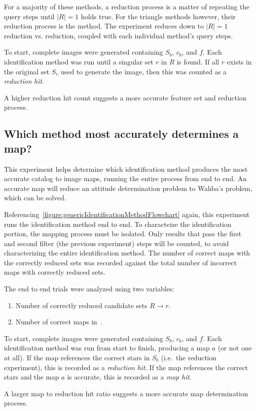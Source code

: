 For a majority of these methods, a reduction process is a matter of repeating the query steps until $|R|=1$ holds true.
For the triangle methods however, their reduction process is the  method.
The experiment reduces down to $|R|=1$ reduction vs.  reduction, coupled with each individual method's
query steps.

To start, complete images were generated containing $S_b$, $c_b$, and $f$.
Each identification method was run until a singular set $r$ in $R$ is found.
If all $r$ exists in the original set $S_r$ used to generate the image, then this was counted as a
\textit{reduction hit}.

A higher reduction hit count suggests a more accurate feature set and reduction process.

\subsection{Which method most accurately determines a map?}\label{subsec:identificationMethods}
This experiment helps determine which identification method produces the most accurate catalog to image maps, running
the entire process from end to end.
An accurate map will reduce an attitude determination problem to Wahba's problem, which can be solved.

Referencing~\autoref{figure:genericIdentificationMethodFlowchart} again, this experiment runs the identification
method end to end.
To characteize the identification portion, the mapping process must be isolated.
Only results that pass the first and second filter (the previous experiment) steps will be counted, to avoid
characterizing the entire identification method.
The number of correct maps with the correctly reduced sets was recorded against the total number of incorrect maps
with correctly reduced sets.

The end to end trials were analyzed using two variables:
\begin{enumerate}
    \item \label{itm:correctReducedCandidates} Number of correctly reduced candidate sets $R \rightarrow r$.
    \item Number of correct maps in~.
\end{enumerate}

To start, complete images were generated containing $S_b$, $c_b$, and $f$.
Each identification method was run from start to finish, producing a map $a$ (or not one at all).
If the map references the correct stars in $S_b$ (i.e.\ the reduction experiment), this is recorded as a
\textit{reduction hit}.
If the map references the correct stars and the map $a$ is accurate, this is recorded as a \textit{map hit}.

A larger map to reduction hit ratio suggests a more accurate map determination process.